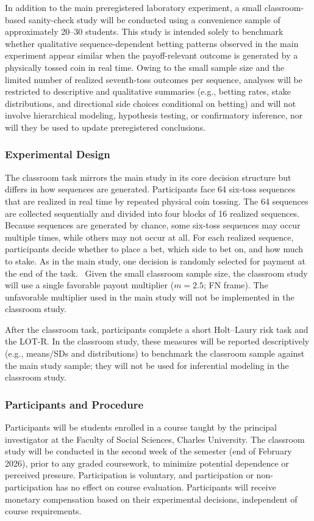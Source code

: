 \documentclass[11pt,a4paper]{article}
\numberwithin{equation}{section}
\begin{document}
In addition to the main preregistered laboratory experiment, a small classroom-based sanity-check study will be conducted using a convenience sample of approximately 20--30 students. This study is intended solely to benchmark whether qualitative sequence-dependent betting patterns observed in the main experiment appear similar when the payoff-relevant outcome is generated by a physically tossed coin in real time. Owing to the small sample size and the limited number of realized seventh-toss outcomes per sequence, analyses will be restricted to descriptive and qualitative summaries (e.g., betting rates, stake distributions, and directional side choices conditional on betting) and will not involve hierarchical modeling, hypothesis testing, or confirmatory inference, nor will they be used to update preregistered conclusions.

\subsubsection{Experimental Design}
The classroom task mirrors the main study in its core decision structure but differs in how sequences are generated. Participants face 64 six-toss sequences that are realized in real time by repeated physical coin tossing. The 64 sequences are collected sequentially and divided into four blocks of 16 realized sequences. Because sequences are generated by chance, some six-toss sequences may occur multiple times, while others may not occur at all. For each realized sequence, participants decide whether to place a bet, which side to bet on, and how much to stake. As in the main study, one decision is randomly selected for payment at the end of the task.
\,
Given the small classroom sample size, the classroom study will use a single favorable payout multiplier ($m = 2.5$; FN frame). The unfavorable multiplier used in the main study will not be implemented in the classroom study.

After the classroom task, participants complete a short Holt--Laury risk task and the LOT-R. In the classroom study, these measures will be reported descriptively (e.g., means/SDs and distributions) to benchmark the classroom sample against the main study sample; they will not be used for inferential modeling in the classroom study.


\subsubsection{Participants and Procedure}
Participants will be students enrolled in a course taught by the principal investigator at the Faculty of Social Sciences, Charles University. The classroom study will be conducted in the second week of the semester (end of February 2026), prior to any graded coursework, to minimize potential dependence or perceived pressure. Participation is voluntary, and participation or non-participation has no effect on course evaluation. Participants will receive monetary compensation based on their experimental decisions, independent of course requirements.
\end{document}
